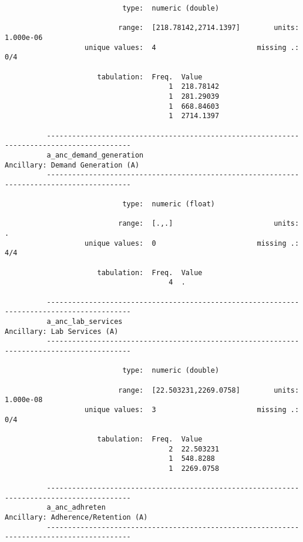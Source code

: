 \documentclass{article}
\begin{document}
\begin{verbatim}
                            type:  numeric (double)
          
                           range:  [218.78142,2714.1397]        units:  1.000e-06
                   unique values:  4                        missing .:  0/4
          
                      tabulation:  Freq.  Value
                                       1  218.78142
                                       1  281.29039
                                       1  668.84603
                                       1  2714.1397
          
          ------------------------------------------------------------------------------------------
          a_anc_demand_generation                                   Ancillary: Demand Generation (A)
          ------------------------------------------------------------------------------------------
          
                            type:  numeric (float)
          
                           range:  [.,.]                        units:  .
                   unique values:  0                        missing .:  4/4
          
                      tabulation:  Freq.  Value
                                       4  .
          
          ------------------------------------------------------------------------------------------
          a_anc_lab_services                                             Ancillary: Lab Services (A)
          ------------------------------------------------------------------------------------------
          
                            type:  numeric (double)
          
                           range:  [22.503231,2269.0758]        units:  1.000e-08
                   unique values:  3                        missing .:  0/4
          
                      tabulation:  Freq.  Value
                                       2  22.503231
                                       1  548.8288
                                       1  2269.0758
          
          ------------------------------------------------------------------------------------------
          a_anc_adhreten                                          Ancillary: Adherence/Retention (A)
          ------------------------------------------------------------------------------------------
          

\end{verbatim}
\end{document}
